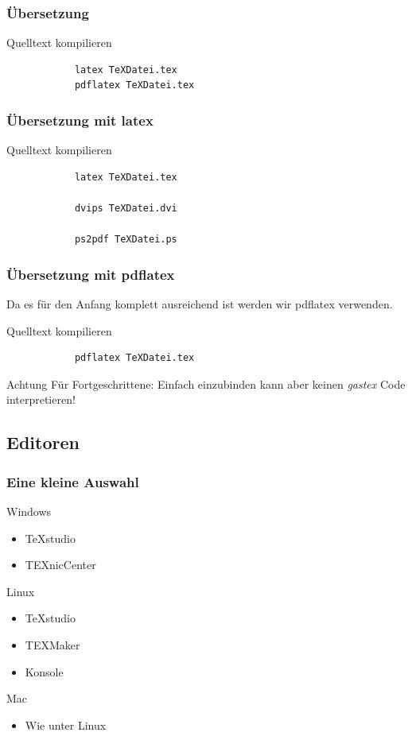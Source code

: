 \begin{frame}[fragile]
	\frametitle{Übersetzung}
	\begin{block}{Quelltext kompilieren}
		\begin{verbatim}
			latex TeXDatei.tex
			pdflatex TeXDatei.tex
		\end{verbatim}
	\end{block}
\end{frame}

\begin{frame}[fragile]
	\frametitle{Übersetzung mit latex}
	\begin{block}{Quelltext kompilieren}
		\begin{verbatim}
			latex TeXDatei.tex

			dvips TeXDatei.dvi

			ps2pdf TeXDatei.ps
		\end{verbatim}
	\end{block}
\end{frame}

\begin{frame}[fragile]
	\frametitle{Übersetzung mit pdflatex}

	Da es für den Anfang komplett ausreichend ist werden wir pdflatex verwenden.
	\pause
	\begin{block}{Quelltext kompilieren}
		\begin{verbatim}
			pdflatex TeXDatei.tex
		\end{verbatim}
	\end{block}
	\pause
	\begin{alertblock}{Achtung}
		Für Fortgeschrittene: Einfach einzubinden kann aber keinen \textit{gastex} Code interpretieren!
	\end{alertblock}
\end{frame}




\subsection{Editoren}

\begin{frame}
	\frametitle{Eine kleine Auswahl}
	\begin{block}{Windows}
		\begin{itemize}
			\item TeXstudio
			\item TEXnicCenter
		\end{itemize}
	\end{block}
	\pause
	\begin{block}{Linux}
		\begin{itemize}
			\item TeXstudio
			\item TEXMaker
			\item Konsole
		\end{itemize}
	\end{block}
	\pause
	\begin{block}{Mac}
		\begin{itemize}
			\item Wie unter Linux
		\end{itemize}
	\end{block}
\end{frame}
